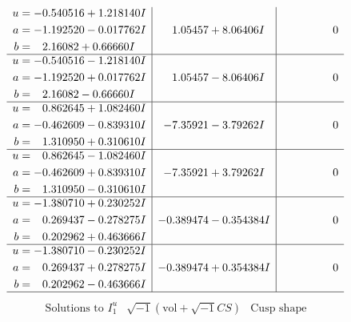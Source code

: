 \documentclass[1p]{elsarticle_modified}
\theoremstyle{definition}
\newcommand{\I}{\sqrt{-1}}
\begin{document}
$$\begin{array}{c|c|c}
\begin{aligned}
u &= -0.540516 + 1.218140 I \\
a &= -1.192520 - 0.017762 I \\
b &= \phantom{-}2.16082 + 0.66660 I\end{aligned}
 & \phantom{-}1.05457 + 8.06406 I & \phantom{-0.000000 } 0 \\ \hline\begin{aligned}
u &= -0.540516 - 1.218140 I \\
a &= -1.192520 + 0.017762 I \\
b &= \phantom{-}2.16082 - 0.66660 I\end{aligned}
 & \phantom{-}1.05457 - 8.06406 I & \phantom{-0.000000 } 0 \\ \hline\begin{aligned}
u &= \phantom{-}0.862645 + 1.082460 I \\
a &= -0.462609 - 0.839310 I \\
b &= \phantom{-}1.310950 + 0.310610 I\end{aligned}
 & -7.35921 - 3.79262 I & \phantom{-0.000000 } 0 \\ \hline\begin{aligned}
u &= \phantom{-}0.862645 - 1.082460 I \\
a &= -0.462609 + 0.839310 I \\
b &= \phantom{-}1.310950 - 0.310610 I\end{aligned}
 & -7.35921 + 3.79262 I & \phantom{-0.000000 } 0 \\ \hline\begin{aligned}
u &= -1.380710 + 0.230252 I \\
a &= \phantom{-}0.269437 - 0.278275 I \\
b &= \phantom{-}0.202962 + 0.463666 I\end{aligned}
 & -0.389474 - 0.354384 I & \phantom{-0.000000 } 0 \\ \hline\begin{aligned}
u &= -1.380710 - 0.230252 I \\
a &= \phantom{-}0.269437 + 0.278275 I \\
b &= \phantom{-}0.202962 - 0.463666 I\end{aligned}
 & -0.389474 + 0.354384 I & \phantom{-0.000000 } 0\\
 \hline 
 \end{array}$$\newpage$$\begin{array}{c|c|c}  
\text{Solutions to }I^u_{1}& \I (\text{vol} + \sqrt{-1}CS) & \text{Cusp shape}\\
 \hline 
\begin{aligned}

\end{aligned}
\end{array}$$
\end{document}
